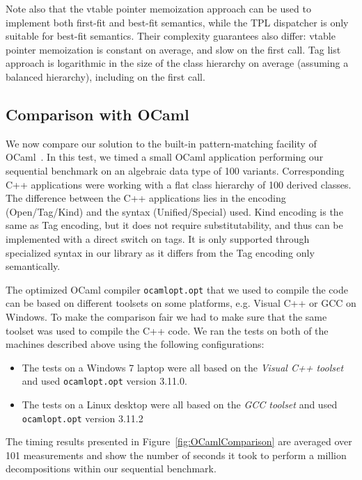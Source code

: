 Note also that the vtable pointer memoization approach can be used to implement both
first-fit and best-fit semantics, while the TPL dispatcher is only suitable 
for best-fit semantics. Their complexity guarantees also differ: vtable pointer 
memoization is constant on average, and slow on the first call. Tag list approach is 
logarithmic in the size of the class hierarchy on average (assuming a balanced 
hierarchy), including on the first call.

\subsection{Comparison with OCaml}
\label{sec:ocaml}

We now compare our solution to the built-in pattern-matching facility of OCaml~\cite{OPM01}. 
In this test, we timed a small OCaml application performing our sequential 
benchmark on an algebraic data type of 100 variants. Corresponding C++ 
applications were working with a flat class hierarchy of 100 derived classes. 
The difference between the C++ applications lies in the encoding (Open/Tag/Kind) 
and the syntax (Unified/Special) used. Kind encoding is the same as Tag encoding, but 
it does not require substitutability, and thus can be implemented with a direct 
switch on tags. It is only supported through specialized syntax in our library 
as it differs from the Tag encoding only semantically.

The optimized OCaml compiler \texttt{ocamlopt.opt} that we used to compile the code 
can be based on different toolsets on some platforms, e.g. Visual C++ or GCC 
on Windows. To make the comparison fair we had to make sure that the 
same toolset was used to compile the C++ code. We ran the tests 
on both of the machines described above using the following configurations: 

\begin{itemize}
\setlength{\itemsep}{0pt}
\setlength{\parskip}{0pt}
\item The tests on a Windows 7 laptop were all based on the \emph{Visual C++ toolset} 
      and used \texttt{ocamlopt.opt} version 3.11.0.
\item The tests on a Linux desktop were all based on the \emph{GCC toolset} and used 
      \texttt{ocamlopt.opt} version 3.11.2
\end{itemize}

\noindent
The timing results presented in Figure~\ref{fig:OCamlComparison} are averaged 
over 101 measurements and show the number of seconds it took to perform a 
million decompositions within our sequential benchmark.

